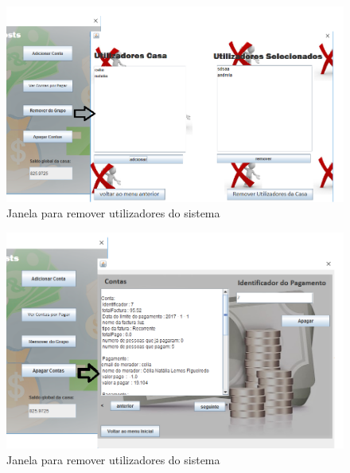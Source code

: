 \begin{figure}[h!]
	\centering
	\includegraphics[scale=0.5]{imagens/interface/removerdogrupoadmin}  
	\caption{Janela para remover utilizadores do sistema}  
\end{figure}


\begin{figure}[h!]
	\centering
	\includegraphics[scale=0.5]{imagens/interface/apagarcontasadmin}  
	\caption{Janela para remover utilizadores do sistema}  
\end{figure}


